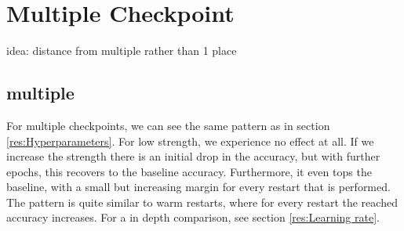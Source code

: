 \section{Multiple Checkpoint}\label{res:Multiple}
idea: distance from multiple rather than 1 place
\subsection{multiple}
For multiple checkpoints, we can see the same pattern as in section
\ref{res:Hyperparameters}. For low strength, we experience no effect at all. If
we increase the strength there is an initial drop in the accuracy, but with
further epochs, this recovers to the baseline accuracy. Furthermore, it even
tops the baseline, with a small but increasing margin for every restart that is
performed. The pattern is quite similar to warm restarts, where for every
restart the reached accuracy increases. For a in depth comparison, see section
\ref{res:Learning rate}.


